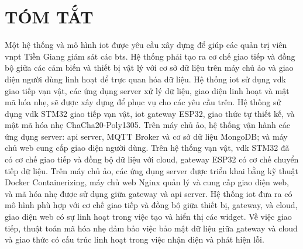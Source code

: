 \chapter*{TÓM TẮT}
\label{Abstract}

Một hệ thống và mô hình \acrfull{iot} được yêu cầu xây dựng để giúp các quản trị viên \acrfull{vnpt} Tiền Giang giám sát các \acrfull{bts}. Hệ thống phải tạo ra cơ chế giao tiếp và đồng bộ giữa các cảm biến và thiết bị vật lý với cơ sở dữ liệu trên máy chủ ảo và giao diện người dùng linh hoạt để trực quan hóa dữ liệu. 
Hệ thống \acrshort{iot} sử dụng \acrfull{vdk} giao tiếp vạn vật, các ứng dụng server xử lý dữ liệu, giao diện linh hoạt và mật mã hóa nhẹ, sẽ được xây dựng để phục vụ cho các yêu cầu trên. 
Hệ thống sử dụng \acrshort{vdk} STM32 giao tiếp vạn vật, \acrshort{iot} gateway ESP32, giao thức tự thiết kế, và mật mã hóa nhẹ ChaCha20-Poly1305. Trên máy chủ ảo, hệ thống vận hành các ứng dụng server: \acrfull{api} server, MQTT Broker và cơ sở dữ liệu MongoDB; và máy chủ web cung cấp giao diện người dùng. 
Trên hệ thống vạn vật, \acrshort{vdk} STM32 đã có cơ chế giao tiếp và đồng bộ dữ liệu với cloud, gateway ESP32 có cơ chế chuyển tiếp dữ liệu. Trên máy chủ ảo, các ứng dụng server được triển khai bằng kỹ thuật Docker Containerizing, máy chủ web Nginx quản lý và cung cấp giao diện web, và mã hóa nhẹ được sử dụng giữa gateway và \acrshort{api} server. 
Hệ thống \acrshort{iot} đưa ra có mô hình phù hợp với cơ chế giao tiếp và đồng bộ giữa thiết bị, gateway, và cloud, giao diện web có sự linh hoạt trong việc tạo và hiển thị các widget. Về việc giao tiếp, thuật toán mã hóa nhẹ đảm bảo việc bảo mật dữ liệu giữa gateway và cloud và giao thức có cấu trúc linh hoạt trong việc nhận diện và phát hiện lỗi.